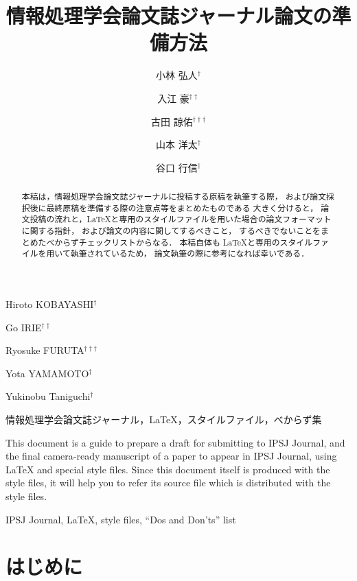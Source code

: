 \documentclass[submit]{ipsj}
\begin{document}
\title{情報処理学会論文誌ジャーナル論文の準備方法}

\author{小林 弘人$^{\dag}$}{Hiroto KOBAYASHI$^{\dag}$}{}
\author{入江 豪$^{\dag\dag}$}{Go IRIE$^{\dag\dag}$}{}
\author{古田 諒佑$^{\dag\dag\dag}$}{Ryosuke FURUTA$^{\dag\dag\dag}$}{}
\author{山本 洋太$^{\dag}$}{Yota YAMAMOTO$^{\dag}$}{}
\author{谷口 行信$^{\dag}$}{Yukinobu Taniguchi$^{\dag}$}{} 


\begin{abstract}
本稿は，情報処理学会論文誌ジャーナルに投稿する原稿を執筆する際，
および論文採択後に最終原稿を準備する際の注意点等をまとめたものである
大きく分けると，
論文投稿の流れと，\LaTeX と専用のスタイルファイルを用いた場合の論文フォーマットに関する指針，
および論文の内容に関してするべきこと，
するべきでないことをまとめたべからずチェックリストからなる．
本稿自体も \LaTeX と専用のスタイルファイルを用いて執筆されているため，
論文執筆の際に参考になれば幸いである．
\end{abstract}

\begin{jkeyword}
情報処理学会論文誌ジャーナル，\LaTeX，スタイルファイル，べからず集
\end{jkeyword}

\begin{eabstract}
This document is a guide to prepare a draft for submitting to IPSJ
Journal, and the final camera-ready manuscript of a paper to appear in
IPSJ Journal, using {\LaTeX} and special style files.  Since this
document itself is produced with the style files, it will help you to
refer its source file which is distributed with the style files.
\end{eabstract}

\begin{ekeyword}
IPSJ Journal, \LaTeX, style files, ``Dos and Don'ts'' list
\end{ekeyword}

\maketitle

\section{はじめに}









\end{document}
